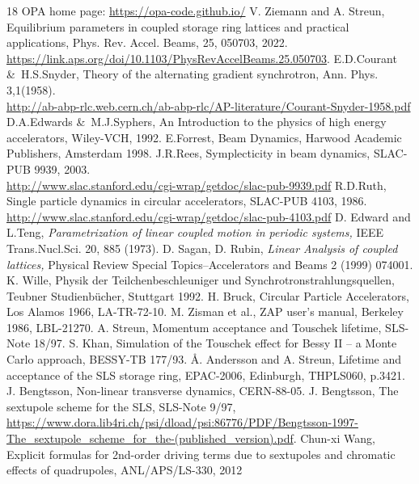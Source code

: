 \documentclass[12pt]{article}
\begin{document}
\begin{thebibliography}{18}
OPA home page: \url{https://opa-code.github.io/} 
V. Ziemann and A. Streun, Equilibrium parameters in coupled storage ring lattices and practical applications, Phys. Rev. Accel. Beams, 25, 050703, 2022. \url{https://link.aps.org/doi/10.1103/PhysRevAccelBeams.25.050703}.
E.D.Courant \&\ H.S.Snyder, Theory of the alternating gradient synchrotron, Ann. Phys. 3,1(1958).\\
 \url{http://ab-abp-rlc.web.cern.ch/ab-abp-rlc/AP-literature/Courant-Snyder-1958.pdf}
D.A.Edwards \&\ M.J.Syphers, An Introduction to the physics of high energy accelerators, Wiley-VCH, 1992.
E.Forrest, Beam Dynamics, Harwood Academic Publishers, Amsterdam 1998.
J.R.Rees, Symplecticity in beam dynamics, SLAC-PUB 9939, 2003.\\
 \url{http://www.slac.stanford.edu/cgi-wrap/getdoc/slac-pub-9939.pdf}
R.D.Ruth, Single particle dynamics in circular accelerators, SLAC-PUB 4103, 1986.\\
 \url{http://www.slac.stanford.edu/cgi-wrap/getdoc/slac-pub-4103.pdf}
 D. Edward and L.Teng, {\em Parametrization of linear coupled motion in periodic
systems,} IEEE Trans.Nucl.Sci. 20, 885 (1973).
D. Sagan, D. Rubin, {\em Linear Analysis of coupled lattices,} Physical Review Special
Topics--Accelerators and Beams 2 (1999) 074001.
K. Wille, Physik der Teilchenbeschleuniger und Synchrotronstrahlungsquellen, Teubner Studienb\"{u}cher, Stuttgart 1992.
H. Bruck, Circular Particle Accelerators, Los Alamos 1966, LA-TR-72-10.
M. Zisman et al., ZAP user's manual, Berkeley 1986, LBL-21270.
A. Streun, Momentum acceptance and Touschek lifetime, SLS-Note 18/97.
S. Khan, Simulation of the Touschek effect for Bessy II -- a Monte
Carlo approach, BESSY-TB 177/93.
\AA. Andersson and A. Streun, Lifetime and acceptance of the SLS storage ring, EPAC-2006, Edinburgh, THPLS060, p.3421.
J. Bengtsson, Non-linear transverse dynamics, CERN-88-05.
J. Bengtsson, The sextupole scheme for the SLS, SLS-Note 9/97,  \url{https://www.dora.lib4ri.ch/psi/dload/psi:86776/PDF/Bengtsson-1997-The\_sextupole\_scheme\_for\_the-(published\_version).pdf}.
Chun-xi Wang, Explicit formulas for 2nd-order driving terms due to sextupoles and chromatic effects of quadrupoles, ANL/APS/LS-330, 2012%

\end{thebibliography}
\end{document}
